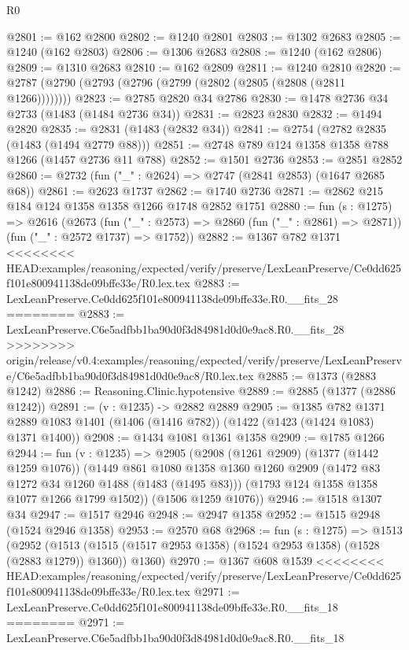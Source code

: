 \begin{lexlean}{R0}
\begin{coremodule}
{{{{{{{{{{{{{{{{{{{{{{{{{{{{{{{{{{{{{{{{{{{{{{{{{{{{{{{{{{{{{{{{{{{{{{{{{{{{{{{{{{{{{{@2801 := @162 @2800
@2802 := @1240 @2801
@2803 := @1302 @2683
@2805 := @1240 (@162 @2803)
@2806 := @1306 @2683
@2808 := @1240 (@162 @2806)
@2809 := @1310 @2683
@2810 := @162 @2809
@2811 := @1240 @2810
@2820 := @2787 (@2790 (@2793 (@2796 (@2799 (@2802 (@2805 (@2808 (@2811 @1266))))))))
@2823 := @2785 @2820 @34 @2786
@2830 := @1478 @2736 @34 @2733 (@1483 (@1484 @2736 @34))
@2831 := @2823 @2830
@2832 := @1494 @2820
@2835 := @2831 (@1483 (@2832 @34))
@2841 := @2754 (@2782 @2835 (@1483 (@1494 @2779 @88)))
@2851 := @2748 @789 @124 @1358 @1358 @788 @1266 (@1457 @2736 @11 @788)
@2852 := @1501 @2736
@2853 := @2851 @2852
@2860 := @2732 (fun ("_" : @2624) => @2747 (@2841 @2853) (@1647 @2685 @68))
@2861 := @2623 @1737
@2862 := @1740 @2736
@2871 := @2862 @215 @184 @124 @1358 @1358 @1266 @1748 @2852 @1751
@2880 := fun (s : @1275) =>
  @2616
    (@2673
      (fun ("_" : @2573) => @2860 (fun ("_" : @2861) => @2871))
      (fun ("_" : @2572 @1737) => @1752))
@2882 := @1367 @782 @1371
<<<<<<<< HEAD:examples/reasoning/expected/verify/preserve/LexLeanPreserve/Ce0dd625f101e800941138de09bffe33e/R0.lex.tex
@2883 := LexLeanPreserve.Ce0dd625f101e800941138de09bffe33e.R0.__fits_28
========
@2883 := LexLeanPreserve.C6e5adfbb1ba90d0f3d84981d0d0e9ac8.R0.__fits_28
>>>>>>>> origin/release/v0.4:examples/reasoning/expected/verify/preserve/LexLeanPreserve/C6e5adfbb1ba90d0f3d84981d0d0e9ac8/R0.lex.tex
@2885 := @1373 (@2883 @1242)
@2886 := Reasoning.Clinic.hypotensive
@2889 := @2885 (@1377 (@2886 @1242))
@2891 := (v : @1235) -> @2882 @2889
@2905 := @1385
    @782
    @1371
    @2889
    @1083
    @1401
    (@1406 (@1416 @782))
    (@1422 (@1423 (@1424 @1083) @1371 @1400))
@2908 := @1434 @1081 @1361 @1358
@2909 := @1785 @1266
@2944 := fun (v : @1235) =>
  @2905
    (@2908
      (@1261 @2909)
      (@1377 (@1442 @1259 @1076))
      (@1449
        @861
        @1080
        @1358
        @1360
        @1260
        @2909
        (@1472 @83 @1272 @34 @1260 @1488 (@1483 (@1495 @83)))
        (@1793 @124 @1358 @1358 @1077 @1266 @1799 @1502))
      (@1506 @1259 @1076))
@2946 := @1518 @1307 @34
@2947 := @1517 @2946
@2948 := @2947 @1358
@2952 := @1515 @2948 (@1524 @2946 @1358)
@2953 := @2570 @68
@2968 := fun (s : @1275) =>
  @1513
    (@2952
      (@1513 (@1515 (@1517 @2953 @1358) (@1524 @2953 @1358) (@1528 (@2883 @1279)) @1360))
      @1360)
@2970 := @1367 @608 @1539
<<<<<<<< HEAD:examples/reasoning/expected/verify/preserve/LexLeanPreserve/Ce0dd625f101e800941138de09bffe33e/R0.lex.tex
@2971 := LexLeanPreserve.Ce0dd625f101e800941138de09bffe33e.R0.__fits_18
========
@2971 := LexLeanPreserve.C6e5adfbb1ba90d0f3d84981d0d0e9ac8.R0.__fits_18
}}}}}}}}}}}}}}}}}}}}}}}}}}}}}}}}}}}}}}}}}}}}}}}}}}}}}}}}}}}}}}}}}}}}}}}}}}}}}}}}}}}}}}
\end{coremodule}
\end{lexlean}
